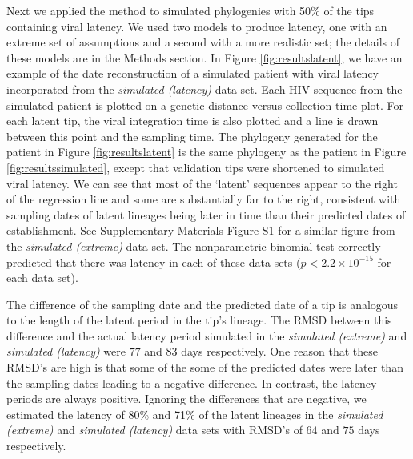 \documentclass{bmcart}
\begin{document}

Next we applied the method to simulated phylogenies with 50\% of the tips containing viral latency.
We used two models to produce latency, one with an extreme set of assumptions and a second with a more realistic set; the details of these models are in the Methods section.
In Figure \ref{fig:resultslatent}, we have an example of the date reconstruction of a simulated patient with viral latency incorporated from the \emph{simulated (latency)} data set.
Each HIV sequence from the simulated patient is plotted on a genetic distance versus collection time plot.
For each latent tip, the viral integration time is also plotted and a line is drawn between this point and the sampling time.
The phylogeny generated for the patient in Figure \ref{fig:resultslatent} is the same phylogeny as the patient in Figure \ref{fig:resultssimulated}, except that validation tips were shortened to simulated viral latency.
We can see that most of the `latent' sequences appear to the right of the regression line and some are substantially far to the right, consistent with sampling dates of latent lineages being later in time than their predicted dates of establishment.
See Supplementary Materials Figure S1 for a similar figure from the \emph{simulated (extreme)} data set.
The nonparametric binomial test correctly predicted that there was latency in each of these data sets ($p < 2.2 \times 10^{-15}$ for each data set).

The difference of the sampling date and the predicted date of a tip is analogous to the length of the latent period in the tip's lineage.
The RMSD between this difference and the actual latency period simulated in the \emph{simulated (extreme)} and \emph{simulated (latency)} were $77$ and $83$ days respectively.
One reason that these RMSD's are high is that some of the some of the predicted dates were later than the sampling dates leading to a negative difference.
In contrast, the latency periods are always positive.
Ignoring the differences that are negative, we estimated the latency of 80\% and 71\% of the latent lineages in the \emph{simulated (extreme)} and \emph{simulated (latency)} data sets with RMSD's of $64$ and $75$ days respectively.
\end{document}

